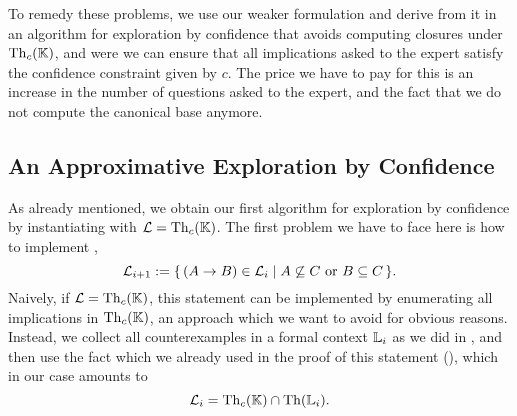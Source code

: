 To remedy these problems, we use our weaker formulation
 and derive from it in
 an algorithm for exploration by confidence that avoids computing
closures under $\operatorname{Th}_{c}({\mathbb{K}})$, and were we can ensure that all implications asked to
the expert satisfy the confidence constraint given by $c$.  The price we have to pay for
this is an increase in the number of questions asked to the expert, and the fact that we
do not compute the canonical base anymore.

\subsection{An Approximative Exploration by Confidence}
\label{sec:expl-conf-1}

As already mentioned, we obtain our first algorithm for exploration by confidence by
instantiating  with $\mathcal{L} = \operatorname{Th}_{c}({\mathbb{K}})$.  The
first problem we have to face here is how to implement , \ie
\begin{equation*}
  \mathcal{L}_{i+1} := {\{\, (A \to B) \in \mathcal{L}_{i} \mid A \not\subseteq C \text{
      or } B \subseteq C \,\}}.
\end{equation*}
Naively, if $\mathcal{L} = \operatorname{Th}_{c}({\mathbb{K}})$, this statement can be implemented by
enumerating all implications in $\operatorname{Th}_{c}({\mathbb{K}})$, an approach which we want to avoid for
obvious reasons.  Instead, we collect all counterexamples in a formal context ${\mathbb{L}}_{i}$
as we did in , and then use the
fact which we already used in the proof of this statement (), which in our
case amounts to
\begin{equation*}
  \mathcal{L}_{i} = \operatorname{Th}_{c}({\mathbb{K}}) \cap \operatorname{Th}({\mathbb{L}}_{i}).
\end{equation*}


